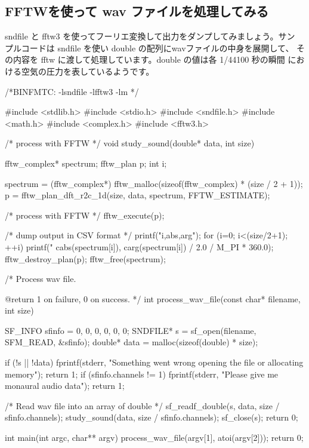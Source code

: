 \documentclass[mingoth,a4paper]{jsarticle}
\begin{document}
\subsection{FFTWを使って wav ファイルを処理してみる}

sndfile と fftw3 を使ってフーリエ変換して出力をダンプしてみましょう。サン
プルコードは sndfile を使い double の配列にwavファイルの中身を展開して、
その内容を fftw に渡して処理しています。double の値は各 1/44100 秒の瞬間
における空気の圧力を表しているようです。

\begin{commandline}
/*BINFMTC: -lsndfile -lfftw3 -lm
 */

#include <stdlib.h>
#include <stdio.h>
#include <sndfile.h>
#include <math.h>
#include <complex.h>
#include <fftw3.h>

/*
  process with FFTW
 */
void study_sound(double* data, int size)
{
  fftw_complex* spectrum;
  fftw_plan p;
  int i;

  spectrum = (fftw_complex*) fftw_malloc(sizeof(fftw_complex) * (size / 2 + 1));
  p = fftw_plan_dft_r2c_1d(size, data, spectrum, FFTW_ESTIMATE);

  /* process with FFTW */
  fftw_execute(p);

  /* dump output in CSV format */
  printf("i,abs,arg\n");
  for (i=0; i<(size/2+1); ++i) {
    printf("%
	   cabs(spectrum[i]),
	   carg(spectrum[i]) / 2.0 / M_PI * 360.0);
  }
  fftw_destroy_plan(p);
  fftw_free(spectrum);
}

/*
  Process wav file.

  @return 1 on failure, 0 on success.
*/
int process_wav_file(const char* filename, int size)
{
  SF_INFO sfinfo = {0, 0, 0, 0, 0, 0};
  SNDFILE* s = sf_open(filename, SFM_READ, &sfinfo);
  double* data = malloc(sizeof(double) * size);

  if (!s || !data)
    {
      fprintf(stderr,
	      "Something went wrong opening the file or allocating memory\n");
      return 1;
    }
  if (sfinfo.channels != 1)
    {
      fprintf(stderr,
	      "Please give me monaural audio data\n");
      return 1;
    }

  /* Read wav file into an array of double */
  sf_readf_double(s, data, size / sfinfo.channels);
  study_sound(data, size / sfinfo.channels);
  sf_close(s);
  return 0;
}

int main(int argc, char** argv)
{
  process_wav_file(argv[1], atoi(argv[2]));
  return 0;
}
\end{commandline}
\end{document}
